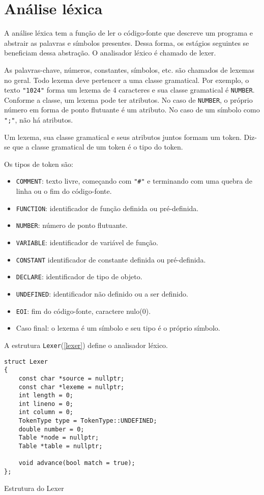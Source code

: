 \documentclass[10pt,a4paper]{article}
\newenvironment{code}{\captionsetup{type=listing}}{}
\begin{document}
\newpage
\section{Análise léxica}
A análise léxica tem a função de ler o código-fonte que descreve um programa e abstrair as palavras e símbolos presentes.
Dessa forma, os estágios seguintes se beneficiam dessa abstração. O analisador léxico é chamado de lexer.

As palavras-chave, números, constantes, símbolos, etc. são chamados de lexemas no geral.
Todo lexema deve pertencer a uma classe gramatical.
Por exemplo, o texto \texttt{"1024"} forma um lexema de 4 caracteres e sua classe gramatical é \texttt{NUMBER}.
Conforme a classe, um lexema pode ter atributos.
No caso de \texttt{NUMBER}, o próprio número em forma de ponto flutuante é um atributo.
No caso de um símbolo como \texttt{";"}, não há atributos.

Um lexema, sua classe gramatical e seus atributos juntos formam um token.
Diz-se que a classe gramatical de um token é o tipo do token.

Os tipos de token são:
\begin{itemize}
\item \texttt{COMMENT}: texto livre, começando com \texttt{"\#"} e
terminando com uma quebra de linha ou o fim do código-fonte.
\item \texttt{FUNCTION}: identificador de função definida ou pré-definida.
\item \texttt{NUMBER}: número de ponto flutuante.
\item \texttt{VARIABLE}: identificador de variável de função.
\item \texttt{CONSTANT} identificador de constante definida ou pré-definida.
\item \texttt{DECLARE}: identificador de tipo de objeto.
\item \texttt{UNDEFINED}: identificador não definido ou a ser definido.
\item \texttt{EOI}: fim do código-fonte, caractere nulo(0).
\item Caso final: o lexema é um símbolo e seu tipo é o próprio símbolo.

\end{itemize}

A estrutura \texttt{Lexer}(\ref{lexer}) define o analisador léxico.
\begin{code}
\begin{verbatim}
struct Lexer
{
    const char *source = nullptr;
    const char *lexeme = nullptr;
    int length = 0;
    int lineno = 0;
    int column = 0;
    TokenType type = TokenType::UNDEFINED;
    double number = 0;
    Table *node = nullptr;
    Table *table = nullptr;

    void advance(bool match = true);
};
\end{verbatim}
\caption{Estrutura do Lexer}
\label{lexer}
\end{code}
\end{document}
